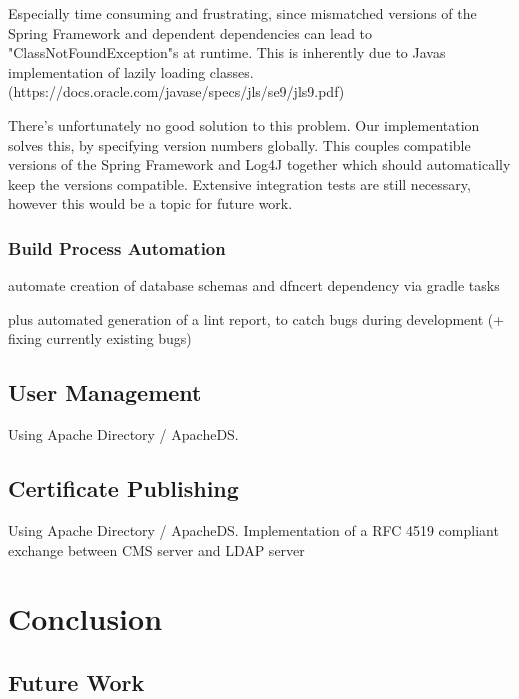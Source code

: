 Especially time consuming and frustrating, since mismatched versions of the Spring Framework and dependent dependencies
can lead to "ClassNotFoundException"s at runtime.
This is inherently due to Javas implementation of lazily loading classes.
(https://docs.oracle.com/javase/specs/jls/se9/jls9.pdf)

There's unfortunately no good solution to this problem.
Our implementation solves this, by specifying version numbers globally.
This couples compatible versions of the Spring Framework and Log4J together which should automatically keep the versions
compatible.
Extensive integration tests are still necessary, however this would be a topic for future work.

\subsection{Build Process Automation}\label{subsec:buildProcessAutomation}
automate creation of database schemas and dfncert dependency via gradle tasks

plus automated generation of a lint report, to catch bugs during development (+ fixing currently existing bugs)

\section{User Management}\label{sec:userManagement}
Using Apache Directory / ApacheDS.


\section{Certificate Publishing}\label{sec:certificatePublishing}
Using Apache Directory / ApacheDS.
Implementation of a RFC 4519 compliant exchange between CMS server and LDAP server

\chapter{Conclusion}\label{ch:conclusion}



\section{Future Work}\label{sec:futureWork}

